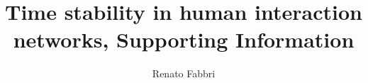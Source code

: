 \documentclass[%
 aip,
 jmp,%
 amsmath,amssymb,
 reprint,%
 floatfix,
]{revtex4-1}
\begin{document}


\title[Interaction networks stability, Supporting Information]{Time stability in human interaction networks, Supporting Information}%

\author{Renato Fabbri}%

%
%
%

%
\end{document}
